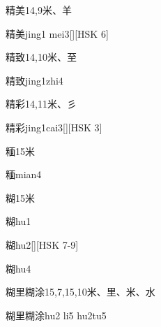 \begin{Entry}{精美}{14,9}{⽶、⽺}
  \begin{Phonetics}{精美}{jing1 mei3}[][HSK 6]
  \end{Phonetics}
\end{Entry}

\begin{Entry}{精致}{14,10}{⽶、⾄}
  \begin{Phonetics}{精致}{jing1zhi4}
  \end{Phonetics}
\end{Entry}

\begin{Entry}{精彩}{14,11}{⽶、⼺}
  \begin{Phonetics}{精彩}{jing1cai3}[][HSK 3]
  \end{Phonetics}
\end{Entry}

\begin{Entry}{糆}{15}{⽶}
  \begin{Phonetics}{糆}{mian4}
  \end{Phonetics}
\end{Entry}

\begin{Entry}{糊}{15}{⽶}
  \begin{Phonetics}{糊}{hu1}
  \end{Phonetics}
  \begin{Phonetics}{糊}{hu2}[][HSK 7-9]
  \end{Phonetics}
  \begin{Phonetics}{糊}{hu4}
  \end{Phonetics}
\end{Entry}

\begin{Entry}{糊里糊涂}{15,7,15,10}{⽶、⾥、⽶、⽔}
  \begin{Phonetics}{糊里糊涂}{hu2 li5 hu2tu5}
  \end{Phonetics}
\end{Entry}

